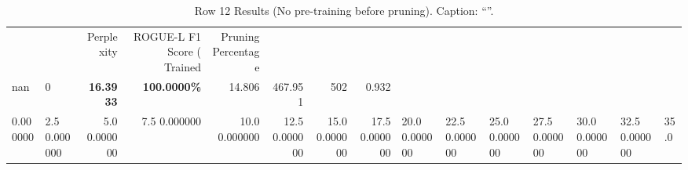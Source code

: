 \begin{table}
\caption{Row 12 Results (No pre-training before pruning). \ifshowcaption{}Caption: ``''.\fi}
\label{tab:evaluation-pipeline-12-untrained}
\begin{tabular}{llrrrrrr}
 &  & Perplexity & ROGUE-L F1 Score (%
Trained & Pruning Percentage &  &  &  &  &  &  \\
nan & 0 & \bfseries 16.3933 & \bfseries 100.0000\% & 14.806 & 467.951 & 502 & 0.932 \\
0.000000 & 2.5%
0.000000 & 5.0%
0.000000 & 7.5%
0.000000 & 10.0%
0.000000 & 12.5%
0.000000 & 15.0%
0.000000 & 17.5%
0.000000 & 20.0%
0.000000 & 22.5%
0.000000 & 25.0%
0.000000 & 27.5%
0.000000 & 30.0%
0.000000 & 32.5%
0.000000 & 35.0%

\end{tabular}
\end{table}

